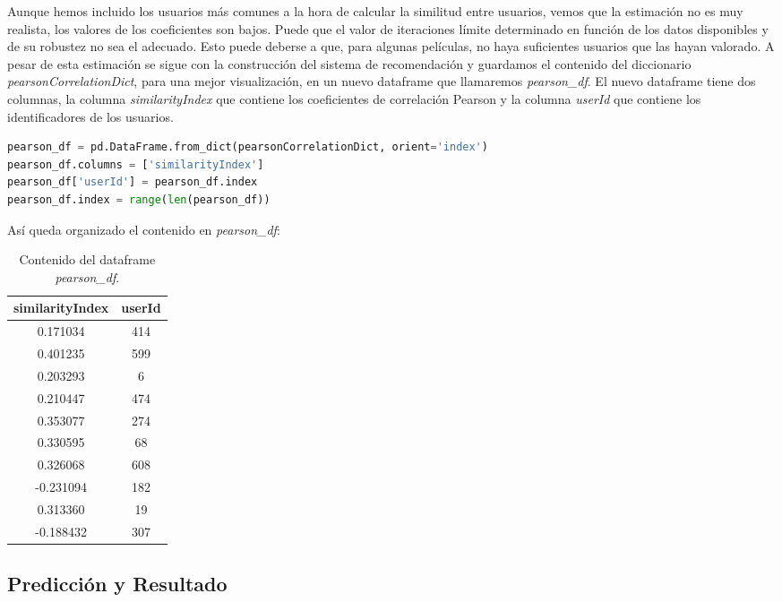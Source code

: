 \documentclass{uimppracticas}
\begin{document}
Aunque hemos incluido los usuarios más comunes a la hora de calcular la similitud entre usuarios, vemos que la estimación no es muy realista, los valores de los coeficientes son bajos. Puede que el valor de iteraciones límite determinado en función de los datos disponibles y de su robustez no sea el adecuado. Esto puede deberse a que, para algunas películas, no haya suficientes usuarios que las hayan valorado. A pesar de esta estimación se sigue con la construcción del sistema de recomendación y guardamos el contenido del diccionario \textit{pearsonCorrelationDict}, para una mejor visualización, en un nuevo dataframe que llamaremos \textit{pearson\_df}. El nuevo dataframe tiene dos columnas, la columna \textit{similarityIndex} que contiene los coeficientes de correlación Pearson y la columna \textit{userId} que contiene los identificadores de los usuarios.

\begin{lstlisting}[language=python, basicstyle=\small]
pearson_df = pd.DataFrame.from_dict(pearsonCorrelationDict, orient='index')
pearson_df.columns = ['similarityIndex']
pearson_df['userId'] = pearson_df.index
pearson_df.index = range(len(pearson_df))
\end{lstlisting}

\newpage

Así queda organizado el contenido en \textit{pearson\_df}:

\begin{table}[H]
	\centering
	\begin{tabular}{cc}
		\toprule
		similarityIndex &  userId \\
		\midrule
		0.171034 &     414 \\
		0.401235 &     599 \\
		0.203293 &       6 \\
		0.210447 &     474 \\
		0.353077 &     274 \\
		0.330595 &      68 \\
		0.326068 &     608 \\
		-0.231094 &     182 \\
		0.313360 &      19 \\
		-0.188432 &     307 \\
		\bottomrule
	\end{tabular}
	\caption{Contenido del dataframe \textit{pearson\_df}.}
\label{pearson_df}
\end{table}


\subsection{Predicción y Resultado}\label{resultados}
\end{document}
